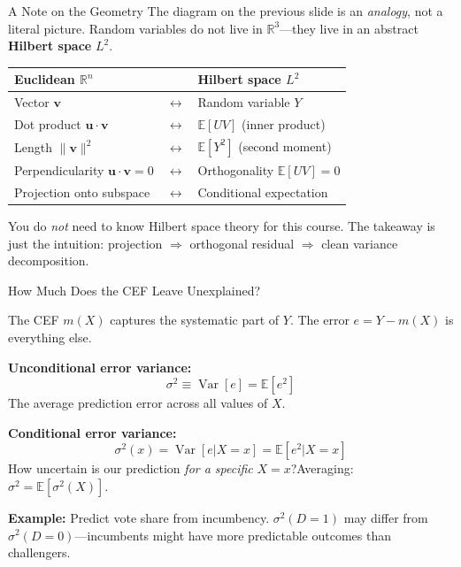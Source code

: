 \documentclass[aspectratio=169, handout, t]{beamer}
\numberwithin{equation}{section}
\begin{document}
\begin{frame}{A Note on the Geometry}
The diagram on the previous slide is an \emph{analogy}, not a literal picture.  Random variables do not live in $\mathbb{R}^3$---they live in an abstract \textbf{Hilbert space} $L^2$.

\medskip
\begin{center}
\begin{tabular}{lll}
\toprule
\textbf{Euclidean $\mathbb{R}^n$} & & \textbf{Hilbert space $L^2$}\\
\midrule
Vector $\mathbf{v}$ & $\longleftrightarrow$ & Random variable $Y$\\
Dot product $\mathbf{u}\cdot\mathbf{v}$ & $\longleftrightarrow$ & $\mathbb{E}[UV]$ (inner product)\\
Length $\|\mathbf{v}\|^2$ & $\longleftrightarrow$ & $\mathbb{E}[Y^2]$ (second moment)\\
Perpendicularity $\mathbf{u}\cdot\mathbf{v}=0$ & $\longleftrightarrow$ & Orthogonality $\mathbb{E}[UV]=0$\\
Projection onto subspace & $\longleftrightarrow$ & Conditional expectation\\
\bottomrule
\end{tabular}
\end{center}

\medskip\pause
You do \emph{not} need to know Hilbert space theory for this course.  The takeaway is just the intuition: \alert{projection $\Rightarrow$ orthogonal residual $\Rightarrow$ clean variance decomposition}.
\end{frame}


\begin{frame}{How Much Does the CEF Leave Unexplained?}

The CEF $m(X)$ captures the systematic part of $Y$.  The error $e = Y - m(X)$ is everything else.

\medskip
\textbf{Unconditional error variance:}
$$\sigma^2 \equiv \operatorname{Var}[e]=\mathbb{E}[e^2]$$
The average prediction error across all values of $X$.

\medskip\pause
\textbf{Conditional error variance:}
$$\sigma^2(x)=\operatorname{Var}[e|X=x]=\mathbb{E}[e^2|X=x]$$
How uncertain is our prediction \emph{for a specific} $X=x$?\quad Averaging: $\sigma^2=\mathbb{E}[\sigma^2(X)]$.

\medskip\pause
\textbf{Example:} Predict vote share from incumbency.  $\sigma^2(D{=}1)$ may differ from $\sigma^2(D{=}0)$---incumbents might have more predictable outcomes than challengers.
\end{frame}
\end{document}
